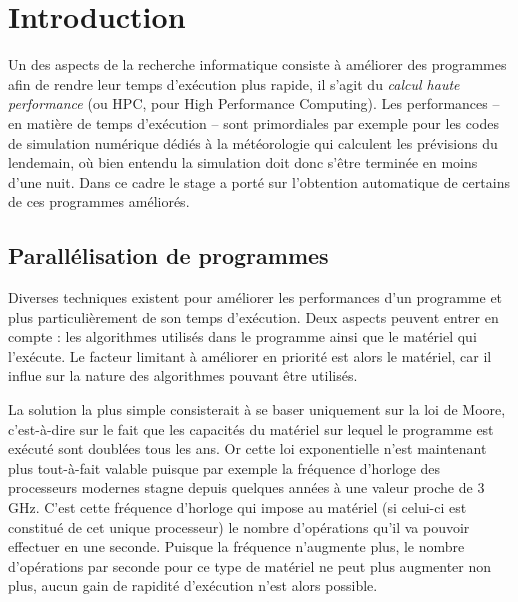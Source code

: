 
\chapter{Introduction}

Un des aspects de la recherche informatique consiste à améliorer des programmes afin de rendre leur temps d'exécution plus rapide, il s'agit du \emph{calcul haute performance} (ou HPC, pour High Performance Computing). Les performances -- en matière de temps d'exécution -- sont primordiales par exemple pour les codes de simulation numérique dédiés à la météorologie qui calculent les prévisions du lendemain, où bien entendu la simulation doit donc s'être terminée en moins d'une nuit. Dans ce cadre le stage a porté sur l'obtention automatique de certains de ces programmes améliorés.


\section{Parallélisation de programmes}

Diverses techniques existent pour améliorer les performances d'un programme et plus particulièrement de son temps d'exécution. Deux aspects peuvent entrer en compte : les algorithmes utilisés dans le programme ainsi que le matériel qui l'exécute. Le facteur limitant à améliorer en priorité est alors le matériel, car il influe sur la nature des algorithmes pouvant être utilisés.

La solution la plus simple consisterait à se baser uniquement sur la loi de Moore, c'est-à-dire sur le fait que les capacités du matériel sur lequel le programme est exécuté sont doublées tous les ans. Or cette loi exponentielle n'est maintenant plus tout-à-fait valable puisque par exemple la fréquence d'horloge des processeurs modernes stagne depuis quelques années à une valeur proche de $3$ GHz. C'est cette fréquence d'horloge qui impose au matériel (si celui-ci est constitué de cet unique processeur) le nombre d'opérations qu'il va pouvoir effectuer en une seconde. Puisque la fréquence n'augmente plus, le nombre d'opérations par seconde pour ce type de matériel ne peut plus augmenter non plus, aucun gain de rapidité d'exécution n'est alors possible.

